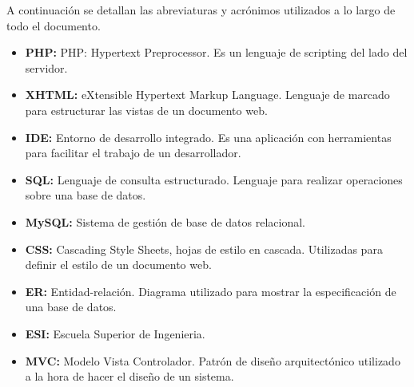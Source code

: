 A continuación se detallan las abreviaturas y acrónimos utilizados a lo largo de todo el documento.

\begin{itemize}
\item {\bf PHP:} PHP: Hypertext Preprocessor. Es un lenguaje de scripting del lado del servidor.
\item {\bf XHTML:} eXtensible Hypertext Markup Language. Lenguaje de marcado para estructurar las vistas de un documento web.
\item {\bf IDE:} Entorno de desarrollo integrado. Es una aplicación con herramientas para facilitar el trabajo de un desarrollador.
\item {\bf SQL:} Lenguaje de consulta estructurado. Lenguaje para realizar operaciones sobre una base de datos.
\item {\bf MySQL:} Sistema de gestión de base de datos relacional.
\item {\bf CSS:} Cascading Style Sheets, hojas de estilo en cascada. Utilizadas para definir el estilo de un documento web.
\item {\bf ER:} Entidad-relación. Diagrama utilizado para mostrar la especificación de una base de datos.
\item {\bf ESI:} Escuela Superior de Ingenieria.
\item {\bf MVC:} Modelo Vista Controlador. Patrón de diseño arquitectónico utilizado a la hora de hacer el diseño de un sistema.
\end{itemize}
